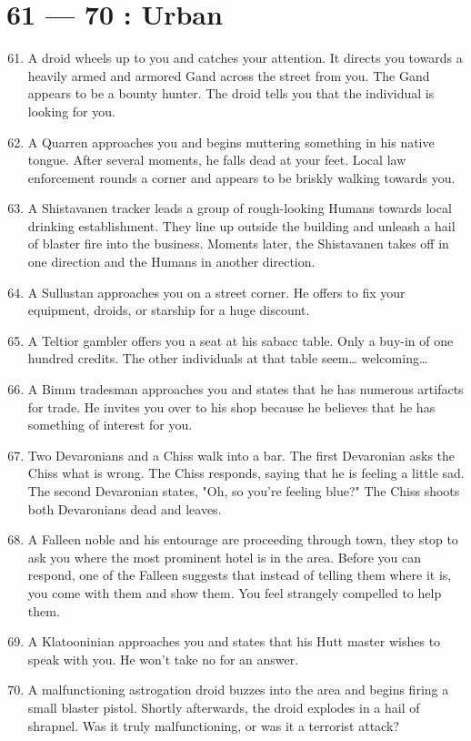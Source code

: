 \documentclass{article}
\begin{document}
\section*{61 --- 70 : Urban}
\begin{enumerate}
	\setcounter{enumi}{60}
	\item A droid wheels up to you and catches your attention. It directs you towards a heavily armed and armored Gand across the street from you. The Gand appears to be a bounty hunter. The droid tells you that the individual is looking for you.
	\item A Quarren approaches you and begins muttering something in his native tongue. After several moments, he falls dead at your feet. Local law enforcement rounds a corner and appears to be briskly walking towards you.
	\item A Shistavanen tracker leads a group of rough-looking Humans towards local drinking establishment. They line up outside the building and unleash a hail of blaster fire into the business. Moments later, the Shistavanen takes off in one direction and the Humans in another direction.
	\item A Sullustan approaches you on a street corner. He offers to fix your equipment, droids, or starship for a huge discount.
	\item A Teltior gambler offers you a seat at his sabacc table. Only a buy-in of one hundred credits. The other individuals at that table seem… welcoming…
	\item A Bimm tradesman approaches you and states that he has numerous artifacts for trade. He invites you over to his shop because he believes that he has something of interest for you.
	\item Two Devaronians and a Chiss walk into a bar. The first Devaronian asks the Chiss what is wrong. The Chiss responds, saying that he is feeling a little sad. The second Devaronian states, "Oh, so you’re feeling blue?" The Chiss shoots both Devaronians dead and leaves.
	\item A Falleen noble and his entourage are proceeding through town, they stop to ask you where the most prominent hotel is in the area. Before you can respond, one of the Falleen suggests that instead of telling them where it is, you come with them and show them. You feel strangely compelled to help them.
	\item A Klatooninian approaches you and states that his Hutt master wishes to speak with you. He won’t take no for an answer.
	\item A malfunctioning astrogation droid buzzes into the area and begins firing a small blaster pistol. Shortly afterwards, the droid explodes in a hail of shrapnel. Was it truly malfunctioning, or was it a terrorist attack?
\end{enumerate}
\end{document}
